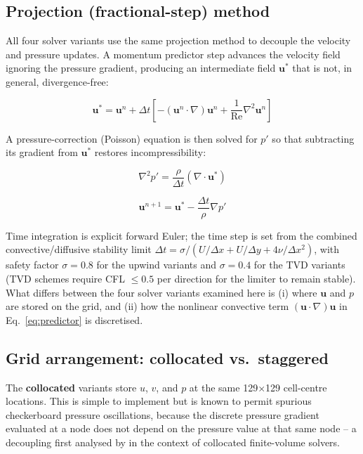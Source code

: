 \documentclass[CHICAGO]{USG}
\begin{document}
\subsection{Projection (fractional-step) method}

All four solver variants use the same projection method \citep{chorin1968} to decouple the velocity and pressure updates. A momentum predictor step advances the velocity field ignoring the pressure gradient, producing an intermediate field $\mathbf{u}^{*}$ that is not, in general, divergence-free:

\begin{equation}
\mathbf{u}^{*} = \mathbf{u}^{n} + \Delta t\left[-(\mathbf{u}^n \cdot \nabla)\mathbf{u}^n + \frac{1}{\mathrm{Re}}\nabla^2 \mathbf{u}^n\right]
\label{eq:predictor}
\end{equation}

A pressure-correction (Poisson) equation is then solved for $p'$ so that subtracting its gradient from $\mathbf{u}^{*}$ restores incompressibility:

\begin{equation}
\nabla^2 p' = \frac{\rho}{\Delta t}\left(\nabla \cdot \mathbf{u}^{*}\right)
\label{eq:poisson}
\end{equation}

\begin{equation}
\mathbf{u}^{n+1} = \mathbf{u}^{*} - \frac{\Delta t}{\rho}\nabla p'
\label{eq:corrector}
\end{equation}

Time integration is explicit forward Euler; the time step is set from the combined convective/diffusive stability limit $\Delta t = \sigma / (U/\Delta x + U/\Delta y + 4\nu/\Delta x^2)$, with safety factor $\sigma = 0.8$ for the upwind variants and $\sigma = 0.4$ for the TVD variants (TVD schemes require CFL $\leq 0.5$ per direction for the limiter to remain stable). What differs between the four solver variants examined here is (i) where $\mathbf{u}$ and $p$ are stored on the grid, and (ii) how the nonlinear convective term $(\mathbf{u} \cdot \nabla)\mathbf{u}$ in Eq.~\eqref{eq:predictor} is discretised.

\subsection{Grid arrangement: collocated vs.\ staggered}

The \textbf{collocated} variants store $u$, $v$, and $p$ at the same 129$\times$129 cell-centre locations. This is simple to implement but is known to permit spurious checkerboard pressure oscillations, because the discrete pressure gradient evaluated at a node does not depend on the pressure value at that same node -- a decoupling first analysed by \citet{rhie1983} in the context of collocated finite-volume solvers.
\end{document}
